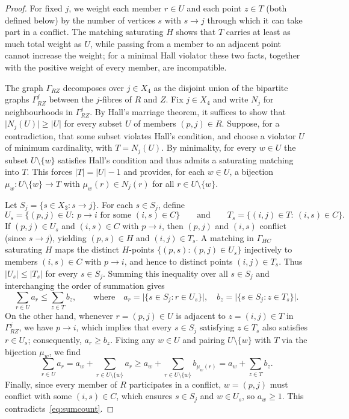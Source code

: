\documentclass[11pt]{amsart}
\theoremstyle{remark}
\newcommand{\abs}[1]{\lvert #1\rvert}
\begin{document}
\begin{proof}
For fixed $j$, we weight each member $r\in U$ and each point $z\in T$ (both defined below) by the number of vertices $s$ with $s\to j$ through which it can take part in a conflict. The matching saturating $H$ shows that $T$ carries at least as much total weight as $U$, while passing from a member to an adjacent point cannot increase the weight; for a minimal Hall violator these two facts, together with the positive weight of every member, are incompatible.

The graph $\Gamma_{RZ}$ decomposes over $j\in X_4$ as the disjoint union of the bipartite graphs $\Gamma_{RZ}^j$ between the $j$-fibres of $R$ and $Z$. Fix $j\in X_4$ and write $N_j$ for neighbourhoods in $\Gamma_{RZ}^j$. By Hall's marriage theorem, it suffices to show that $\abs{N_j(U)}\ge\abs U$ for every subset $U$ of members $(p,j)\in R$. Suppose, for a contradiction, that some subset violates Hall's condition, and choose a violator $U$ of minimum cardinality, with $T=N_j(U)$. By minimality, for every $w\in U$ the subset $U\setminus\{w\}$ satisfies Hall's condition and thus admits a saturating matching into $T$. This forces $\abs T=\abs U-1$ and provides, for each $w\in U$, a bijection $\mu_w\colon U\setminus\{w\}\to T$ with $\mu_w(r)\in N_j(r)$ for all $r\in U\setminus\{w\}$.

Let $S_j=\{s\in X_3:s\to j\}$. For each $s\in S_j$, define
\[
  U_s=\{(p,j)\in U:\ p\to i\text{ for some }(i,s)\in C\}\qquad\text{and}\qquad
  T_s=\{(i,j)\in T:\ (i,s)\in C\}.
\]
If $(p,j)\in U_s$ and $(i,s)\in C$ with $p\to i$, then $(p,j)$ and $(i,s)$ conflict (since $s\to j$), yielding $(p,s)\in H$ and $(i,j)\in T_s$. A matching in $\Gamma_{HC}$ saturating $H$ maps the distinct $H$-points $\{(p,s):(p,j)\in U_s\}$ injectively to members $(i,s)\in C$ with $p\to i$, and hence to distinct points $(i,j)\in T_s$. Thus $\abs{U_s}\le\abs{T_s}$ for every $s\in S_j$. Summing this inequality over all $s\in S_j$ and interchanging the order of summation gives
\begin{equation}\label{eq:sumcount}
  \sum_{r\in U}a_r\le\sum_{z\in T}b_z,\qquad\text{where}\quad
  a_r=\abs{\{s\in S_j:r\in U_s\}},\quad b_z=\abs{\{s\in S_j:z\in T_s\}}.
\end{equation}
On the other hand, whenever $r=(p,j)\in U$ is adjacent to $z=(i,j)\in T$ in $\Gamma_{RZ}^j$, we have $p\to i$, which implies that every $s\in S_j$ satisfying $z\in T_s$ also satisfies $r\in U_s$; consequently, $a_r\ge b_z$. Fixing any $w\in U$ and pairing $U\setminus\{w\}$ with $T$ via the bijection $\mu_w$, we find
\[
  \sum_{r\in U}a_r=a_w+\sum_{r\in U\setminus\{w\}}a_r\ge a_w+\sum_{r\in U\setminus\{w\}}b_{\mu_w(r)}=a_w+\sum_{z\in T}b_z.
\]
Finally, since every member of $R$ participates in a conflict, $w=(p,j)$ must conflict with some $(i,s)\in C$, which ensures $s\in S_j$ and $w\in U_s$, so $a_w\ge 1$. This contradicts~\eqref{eq:sumcount}.
\end{proof}
\end{document}
